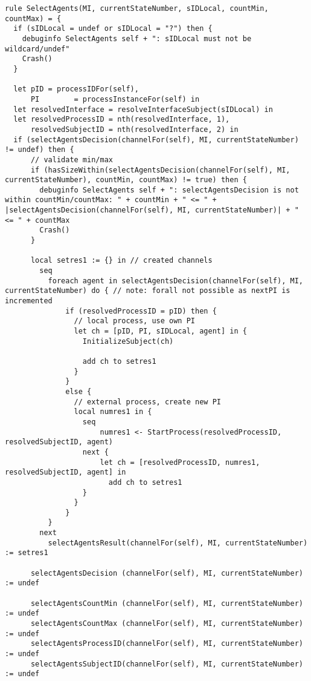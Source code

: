 \begin{listing}[H]
\begin{verbatim}
rule SelectAgents(MI, currentStateNumber, sIDLocal, countMin, countMax) = {
  if (sIDLocal = undef or sIDLocal = "?") then {
    debuginfo SelectAgents self + ": sIDLocal must not be wildcard/undef"
    Crash()
  }

  let pID = processIDFor(self),
      PI        = processInstanceFor(self) in
  let resolvedInterface = resolveInterfaceSubject(sIDLocal) in
  let resolvedProcessID = nth(resolvedInterface, 1),
      resolvedSubjectID = nth(resolvedInterface, 2) in
  if (selectAgentsDecision(channelFor(self), MI, currentStateNumber) != undef) then {
      // validate min/max
      if (hasSizeWithin(selectAgentsDecision(channelFor(self), MI, currentStateNumber), countMin, countMax) != true) then {
        debuginfo SelectAgents self + ": selectAgentsDecision is not within countMin/countMax: " + countMin + " <= " + |selectAgentsDecision(channelFor(self), MI, currentStateNumber)| + " <= " + countMax
        Crash()
      }

      local setres1 := {} in // created channels
        seq
          foreach agent in selectAgentsDecision(channelFor(self), MI, currentStateNumber) do { // note: forall not possible as nextPI is incremented
              if (resolvedProcessID = pID) then {
                // local process, use own PI
                let ch = [pID, PI, sIDLocal, agent] in {
                  InitializeSubject(ch)

                  add ch to setres1
                }
              }
              else {
                // external process, create new PI
                local numres1 in {
                  seq
                      numres1 <- StartProcess(resolvedProcessID, resolvedSubjectID, agent)
                  next {
                      let ch = [resolvedProcessID, numres1, resolvedSubjectID, agent] in
                        add ch to setres1
                  }
                }
              }
          }
        next
          selectAgentsResult(channelFor(self), MI, currentStateNumber) := setres1

      selectAgentsDecision (channelFor(self), MI, currentStateNumber) := undef

      selectAgentsCountMin (channelFor(self), MI, currentStateNumber) := undef
      selectAgentsCountMax (channelFor(self), MI, currentStateNumber) := undef
      selectAgentsProcessID(channelFor(self), MI, currentStateNumber) := undef
      selectAgentsSubjectID(channelFor(self), MI, currentStateNumber) := undef


\end{verbatim}
\end{listing}
